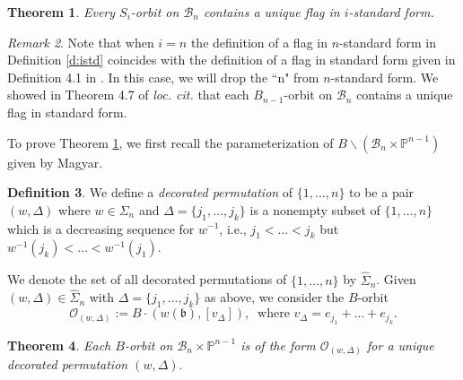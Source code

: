 \documentclass[12pt]{amsart}
\numberwithin{equation}{section}
\newtheorem{thm}{Theorem}[section]
\theoremstyle{remark}
\newtheorem{rem}[thm]{Remark}
\theoremstyle{definition}
\newtheorem{dfn}[thm]{Definition}
\newcommand{\fb}{\mbox{${\mathfrak b}$}}
\newcommand{\C}{\mbox{${\mathbb C}$}}
\newcommand{\B}{\mathcal{B}}
\begin{document}
\begin{thm}\label{thm:istd}
 Every $S_{i}$-orbit on $\B_{n}$ contains a unique flag in $i$-standard form.  
 \end{thm}
 
 \begin{rem}\label{r:usual}
Note that when $i=n$ the definition of a flag in $n$-standard form in Definition \ref{d:istd} coincides with the definition of a flag in standard form given in Definition 4.1 in \cite{CE21II}.  In this case, we will drop the ``n" from $n$-standard form.  We showed in Theorem 4.7 of \emph{loc. cit.} that each $B_{n-1}$-orbit on $\B_{n}$ contains a unique flag in standard form. %
\end{rem}
 
 
To prove Theorem \ref{thm:istd}, we first recall 
the parameterization of $B\backslash(\B_{n}\times\mathbb{P}^{n-1})$ given by Magyar.

\begin{dfn}\label{d:marked}
We define a \emph{decorated permutation} of $\{1,\dots, n\}$ to be a pair $(w,\Delta)$ where $w\in\Sigma_{n}$ and $\Delta=\{j_{1},\dots, j_{k}\}$ is a nonempty subset of $\{1,\dots,n\}$ which is a decreasing sequence for $w^{-1}$, i.e., $j_1 < \dots < j_{k}$ but $w^{-1}(j_{k})<\dots< w^{-1}(j_{1})$.
\end{dfn}

We denote the set of all decorated permutations of $\{1,\dots, n\}$ by $\widehat{\Sigma}_{n}$.  Given  $(w,\Delta) \in \widehat{\Sigma}_{n}$ with 
$\Delta=\{j_{1},\dots, j_{k}\}$ as above,
 we consider the $B$-orbit 
\[
{\mathcal{O}}_{(w,\Delta)}:= B\cdot (w(\fb), [v_{\Delta}]), \ \text{ where } v_{\Delta}=e_{j_1}+\dots + e_{j_k}.
\]

\begin{thm}\label{thm:magyar}\cite{Magyar}
Each $B$-orbit on $\B_{n}\times\mathbb{P}^{n-1}$ is of the form ${\mathcal{O}}_{(w,\Delta)}$ for a unique decorated permutation $(w,\Delta).$
\end{thm}
\end{document}

